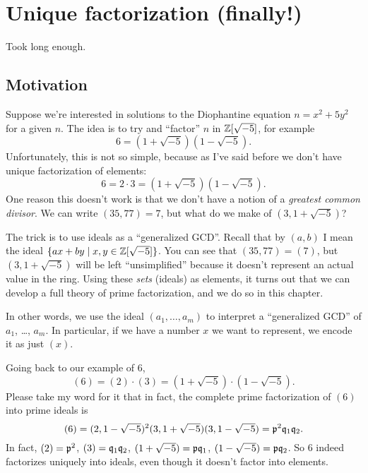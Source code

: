 \chapter{Unique factorization (finally!)}
\label{ch:unique_factorization}
Took long enough.

\section{Motivation}
Suppose we're interested in solutions to the
Diophantine equation $n = x^2 + 5y^2$ for a given $n$.
The idea is to try and ``factor'' $n$ in $\mathbb Z[\sqrt{-5}]$,
for example \[ 6 = (1+\sqrt{-5})(1-\sqrt{-5}). \]
Unfortunately, this is not so simple, because as I've said before
we don't have unique factorization of elements:
\[ 6 = 2 \cdot 3 = \left( 1+\sqrt{-5} \right)\left( 1-\sqrt{-5} \right). \]
One reason this doesn't work is that we don't have a notion of a
\emph{greatest common divisor}.
We can write $(35, 77) = 7$, but what do we make of $(3, 1+\sqrt{-5})$?

The trick is to use ideals as a ``generalized GCD''.
Recall that by $(a,b)$ I mean the ideal $\{ax + by \mid x,y \in \mathbb Z[\sqrt{-5}] \}$.
You can see that $(35, 77) = (7)$,
but $(3, 1+\sqrt{-5})$ will be left ``unsimplified'' because it doesn't
represent an actual value in the ring.
Using these \emph{sets} (ideals) as elements,
it turns out that we can develop a full theory
of prime factorization, and we do so in this chapter.

In other words, we use the ideal $(a_1, \dots, a_m)$
to interpret a ``generalized GCD'' of $a_1$, \dots, $a_m$.
In particular, if we have a number $x$ we want to represent,
we encode it as just $(x)$.

Going back to our example of $6$,
\[ (6) = (2) \cdot (3)
	= \left( 1+\sqrt{-5} \right) \cdot \left( 1-\sqrt{-5} \right). \]
Please take my word for it that in fact,
the complete prime factorization of $(6)$ into prime ideals is
\[
	(6)
	= (2,1-\sqrt{-5})^2 (3,1+\sqrt{-5})(3,1-\sqrt{-5})
	= \mathfrak p^2 \mathfrak q_1 \mathfrak q_2. \]
In fact, $(2) = \mathfrak p^2$, $(3) = \mathfrak q_1 \mathfrak q_2$,
$(1+\sqrt{-5}) = \mathfrak p \mathfrak q_1$, $(1-\sqrt{-5}) = \mathfrak p \mathfrak q_2$.
So $6$ indeed factorizes uniquely into ideals,
even though it doesn't factor into elements.

